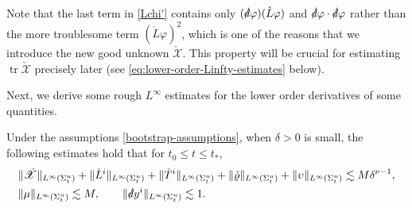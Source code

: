 \documentclass[11pt,twoside]{article}
\def\de{\delta}
\def\Si{\Sigma}
\def\vp{\varphi}
\def\les{\lesssim}
\begin{document}
\begin{remark}
Note that the last term in \eqref{Lchi'} contains only $(\slashed{d}\vp)(\mathring{L}\vp)$ and $\slashed{d}\vp \cdot \slashed{d}\vp$
rather than the more troublesome term $(\mathring{L}\vp)^2$, which is one of the reasons that we introduce the new good unknown $\check{\mathscr{X}}$.
This property will be crucial for estimating $\operatorname{tr}\check{\mathscr{X}}$ precisely later (see \eqref{eq:lower-order-Linfty-estimates} below).
\end{remark}

Next, we derive some rough $L^{\infty}$ estimates for the lower order derivatives of some quantities.

\begin{proposition}\label{prop:lower-order-Linfty-estimates}
 Under the assumptions \eqref{bootstrap-assumptions}, when $\de > 0$ is small,
the following estimates hold that for $t_0 \leq t \leq t_*$,
 \begin{equation}\label{eq:lower-order-Linfty-estimates}
 \begin{split}
 &\|\check{\mathscr{X}}\|_{L^\infty(\Si_t^u)} + \|\check{L}^i\|_{L^\infty(\Si_t^u)} + \|\check{T}^i\|_{L^\infty(\Si_t^u)} + \|\check{\varrho}\|_{L^\infty(\Si_t^u)} + \|\upsilon\|_{L^\infty(\Si_t^u)} \les M\de^{\nu-1}, \\
 &\|\mu\|_{L^\infty(\Si_t^u)} \les M, \qquad \|\slashed{d}y^i\|_{L^\infty(\Si_t^u)} \lesssim 1.
 \end{split}
 \end{equation}
\end{proposition}
\end{document}
